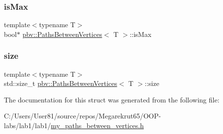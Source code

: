 \mbox{\label{structpbv_1_1_paths_between_vertices_a8d7391a03771f17ca699f519e64bf2a4}} 
\subsubsection{\texorpdfstring{is\+Max}{isMax}}
{\footnotesize\ttfamily template$<$typename T$>$ \\
bool$\ast$ \mbox{\hyperlink{structpbv_1_1_paths_between_vertices}{pbv\+::\+Paths\+Between\+Vertices}}$<$ T $>$\+::is\+Max}

\mbox{\label{structpbv_1_1_paths_between_vertices_a7ffee986b1b7f57a881a883b58bc67f4}} 
\subsubsection{\texorpdfstring{size}{size}}
{\footnotesize\ttfamily template$<$typename T$>$ \\
std\+::size\+\_\+t \mbox{\hyperlink{structpbv_1_1_paths_between_vertices}{pbv\+::\+Paths\+Between\+Vertices}}$<$ T $>$\+::size}



The documentation for this struct was generated from the following file\+:\begin{DoxyCompactItemize}
\item 
C\+:/\+Users/\+User81/source/repos/\+Megarekrut65/\+O\+O\+P-\/labs/lab1/lab1/\mbox{\hyperlink{my__paths__between__vertices_8h}{my\+\_\+paths\+\_\+between\+\_\+vertices.\+h}}\end{DoxyCompactItemize}
